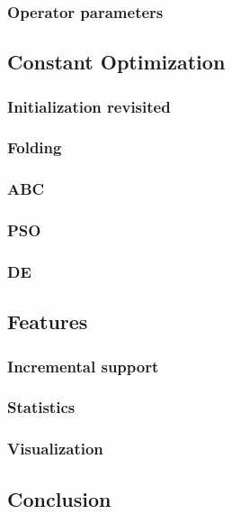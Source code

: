 \subsubsection{Operator parameters}
%

\subsection{Constant Optimization}
\subsubsection{Initialization revisited}
\subsubsection{Folding}
\subsubsection{ABC}
\subsubsection{PSO}
\subsubsection{DE}

\subsection{Features}
\subsubsection{Incremental support}
\subsubsection{Statistics}
\subsubsection{Visualization}
%

\subsection{Conclusion}
% 
